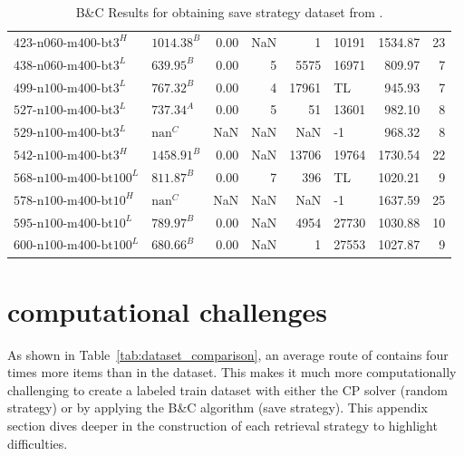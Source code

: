 \begin{table}[ht]
\begin{tabular}{llrrrlrr}
        $\text{423-n060-m400-bt3}^H$   & $\text{1014.38}^B$ & 0.00 & NaN   & 1      & 10191 & 1534.87 & 23    \\
        $\text{438-n060-m400-bt3}^L$   & $\text{639.95}^B$  & 0.00 & 5     & 5575   & 16971 & 809.97  & 7     \\
        $\text{499-n100-m400-bt3}^L$   & $\text{767.32}^B$  & 0.00 & 4     & 17961  & TL    & 945.93  & 7     \\
        $\text{527-n100-m400-bt3}^L$   & $\text{737.34}^A$  & 0.00 & 5     & 51     & 13601 & 982.10  & 8     \\
        $\text{529-n100-m400-bt3}^L$   & $\text{nan}^C$     & NaN  & NaN   & NaN    & -1    & 968.32  & 8     \\
        $\text{542-n100-m400-bt3}^H$   & $\text{1458.91}^B$ & 0.00 & NaN   & 13706  & 19764 & 1730.54 & 22    \\
        $\text{568-n100-m400-bt100}^L$ & $\text{811.87}^B$  & 0.00 & 7     & 396    & TL    & 1020.21 & 9     \\
        $\text{578-n100-m400-bt10}^H$  & $\text{nan}^C$     & NaN  & NaN   & NaN    & -1    & 1637.59 & 25    \\
        $\text{595-n100-m400-bt10}^L$  & $\text{789.97}^B$  & 0.00 & NaN   & 4954   & 27730 & 1030.88 & 10    \\
        $\text{600-n100-m400-bt100}^L$ & $\text{680.66}^B$  & 0.00 & NaN   & 1      & 27553 & 1027.87 & 9     \\
        \bottomrule
    \end{tabular}


    \caption{B\&C Results for obtaining save strategy dataset from \krebsADataSet.}
    \label{tab:bc_results_krebs}
\end{table}

\clearpage

\section{\krebsADataSetText computational challenges}
\label{app:sec:krebs_computationally_challenges}

As shown in Table~\ref{tab:dataset_comparison}, an average route of \krebsADataSetText contains four times more items than
in the \gendreauDataSetText dataset. This makes it much more computationally challenging to create a labeled train dataset with either
the \gls{CP} solver (random strategy) or by applying the B\&C algorithm (save strategy). This appendix section dives deeper in
the construction of each retrieval strategy to highlight difficulties.

